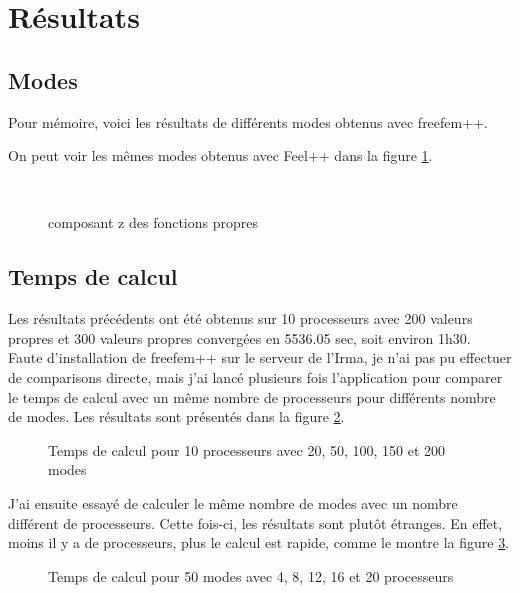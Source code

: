 \section{Résultats}
\subsection{Modes}

Pour mémoire, voici les résultats de différents modes obtenus avec freefem++.\\

\begin{figure}[H]
\end{figure}

On peut voir les mêmes modes obtenus avec Feel++ dans la figure \ref{resultats}.\\

\begin{figure}[H]
	\\
	\makebox[\textwidth][c]{
		\subfloat[mode57]{\texttt{[image: mode57]}}\ 
		\subfloat[mode194]{\texttt{[image: mode194]}}
	}
	\caption{composant z des fonctions propres}
	\label{resultats}
\end{figure}

\subsection{Temps de calcul}

Les résultats précédents ont été obtenus sur 10 processeurs avec 200 valeurs propres et 300 valeurs propres convergées en 5536.05 sec, soit environ 1h30.\\

Faute d'installation de freefem++ sur le serveur de l'Irma, je n'ai pas pu effectuer de comparisons directe, mais j'ai lancé plusieurs fois l'application pour comparer le temps de calcul avec un même nombre de processeurs pour différents nombre de modes. Les résultats sont présentés dans la figure \ref{temps_proc}.\\

\begin{figure}[H]
\caption{Temps de calcul pour 10 processeurs avec 20, 50, 100, 150 et 200 modes}
\label{temps_proc}
\end{figure}

J'ai ensuite essayé de calculer le même nombre de modes avec un nombre différent de processeurs. Cette fois-ci, les résultats sont plutôt étranges. En effet, moins il y a de processeurs, plus le calcul est rapide, comme le montre la figure \ref{temps_mode}.

\begin{figure}[H]
\caption{Temps de calcul pour 50 modes avec 4, 8, 12, 16 et 20 processeurs}
\label{temps_mode}
\end{figure}
